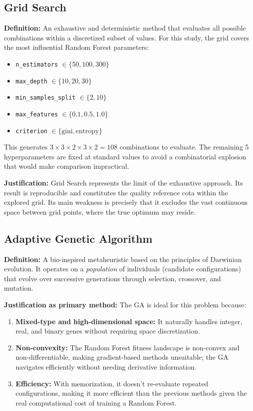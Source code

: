 \documentclass[12pt, a4paper]{article}
\begin{document}
\subsection{Grid Search}

\textbf{Definition:} An exhaustive and deterministic method that evaluates all possible
combinations within a discretized subset of values. For this study, the grid covers
the most influential Random Forest parameters:

\begin{itemize}[itemsep=0.2em]
  \item \texttt{n\_estimators} $\in \{50, 100, 300\}$
  \item \texttt{max\_depth} $\in \{10, 20, 30\}$
  \item \texttt{min\_samples\_split} $\in \{2, 10\}$
  \item \texttt{max\_features} $\in \{0.1, 0.5, 1.0\}$
  \item \texttt{criterion} $\in \{\text{gini}, \text{entropy}\}$
\end{itemize}

This generates $3 \times 3 \times 2 \times 3 \times 2 = 108$ combinations to evaluate.
The remaining 5 hyperparameters are fixed at standard values to avoid a combinatorial
explosion that would make comparison impractical.

\textbf{Justification:} Grid Search represents the limit of the exhaustive approach.
Its result is reproducible and constitutes the quality reference cota within the
explored grid. Its main weakness is precisely that it excludes the vast continuous
space between grid points, where the true optimum may reside.

\subsection{Adaptive Genetic Algorithm}

\textbf{Definition:} A bio-inspired metaheuristic based on the principles of Darwinian
evolution. It operates on a \textit{population} of individuals (candidate configurations)
that evolve over successive generations through selection, crossover, and mutation.

\textbf{Justification as primary method:} The GA is ideal for this problem because:
\begin{enumerate}[itemsep=0.2em]
  \item \textbf{Mixed-type and high-dimensional space:} It naturally handles integer,
        real, and binary genes without requiring space discretization.
  \item \textbf{Non-convexity:} The Random Forest fitness landscape is non-convex and
        non-differentiable, making gradient-based methods unsuitable; the GA navigates
        efficiently without needing derivative information.
  \item \textbf{Efficiency:} With memorization, it doesn't re-evaluate repeated
        configurations, making it more efficient than the previous methods given the
        real computational cost of training a Random Forest.
\end{enumerate}
\end{document}
